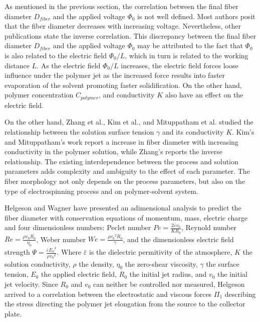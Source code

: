 As mentioned in the previous section, the correlation between the final fiber diameter $D_{fiber}$ and the applied voltage $\Phi_0$ is not well defined. Most authors posit that the fiber diameter decreases with increasing voltage. \cite{Yuan2004, Wang2009, Thompson2007, Sajeev2008, Mazoochi2011, MATARAM2011, Liu2007, Homayoni2009, Zhang2005} Nevertheless, other publications state the inverse correlation. \cite{Rojas2009, Jeun2007} This discrepancy between the final fiber diameter $D_{fiber}$ and the applied voltage $\Phi_0$ may be attributed to the fact that $\Phi_0$ is also related to the electric field $\Phi_0 / L$, which in turn is related to the working distance $L$. As the electric field $\Phi_0 / L$ increases, the electric field forces loose influence under the polymer jet as the increased force results into faster evaporation of the solvent promoting faster solidification. On the other hand, polymer concentration $C_{polymer}$, and conductivity $K$ also have an effect on the electric field. \cite{Thompson2007, Mohan2002} 

On the other hand, Zhang et al., Kim et al., and Mituppatham et al. studied the relationship between the solution surface tension $\gamma$ and its conductivity $K$. \cite{Zhang2005, Kim2005, Mituppatham2004} Kim's and Mituppatham's work report a increase in fiber diameter with increasing conductivity in the polymer solution, while Zhang's reports the inverse relationship. The existing interdependence between the process and solution parameters adds complexity and ambiguity to the effect of each parameter. The fiber morphology not only depends on the process parameters, but also on the type of electrospinning process and on polymer-solvent system. \cite{Gadkari2014}

Helgeson and Wagner \cite{Helgeson2007} have presented an adimensional analysis to predict the fiber diameter with conservation equations of momentum, mass, electric charge and four dimensionless numbers: Peclet number $ \displaystyle Pe = \frac{2 \bar{\varepsilon} v_0}{K R_0} $, Reynold number $ \displaystyle Re = \frac{\rho v_0 R_0}{\eta_0} $, Weber number $ \displaystyle We = \frac{\rho {v_0}^2 R_0}{\gamma} $, and the dimensionless electric field strength $ \displaystyle \Psi = \frac{\bar{\varepsilon} {E_0}^2}{\rho {v_0}^2} $. Where $\bar{\varepsilon}$ is the dielectric permitivity of the atmosphere, $K$ the solution conductivity, $\rho$ the density, $\eta_0$ the zero-shear viscosity, $\gamma$ the surface tension, $E_0$ the applied electric field, $R_0$ the initial jet radius, and $v_0$ the initial jet velocity. Since $R_0$ and $v_0$ can neither be controlled nor measured, Helgeson arrived to a correlation between the electrostatic and viscous forces $\Pi_1$ describing the stress directing the polymer jet elongation from the source to the collector plate. \cite{Helgeson2007}

